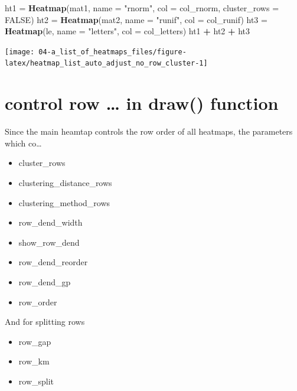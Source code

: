 \documentclass[]{book}
\newenvironment{Shaded}{\begin{snugshade}}{\end{snugshade}}
\newcommand{\KeywordTok}[1]{\textcolor[rgb]{0.13,0.29,0.53}{\textbf{#1}}}
\newcommand{\DataTypeTok}[1]{\textcolor[rgb]{0.13,0.29,0.53}{#1}}
\newcommand{\StringTok}[1]{\textcolor[rgb]{0.31,0.60,0.02}{#1}}
\newcommand{\OtherTok}[1]{\textcolor[rgb]{0.56,0.35,0.01}{#1}}
\newcommand{\OperatorTok}[1]{\textcolor[rgb]{0.81,0.36,0.00}{\textbf{#1}}}
\newcommand{\NormalTok}[1]{#1}
\providecommand{\tightlist}{%
  \setlength{\itemsep}{0pt}\setlength{\parskip}{0pt}}
\theoremstyle{definition}
\theoremstyle{definition}
\theoremstyle{definition}
\theoremstyle{remark}
\begin{document}
\begin{Shaded}
\begin{Highlighting}[]
\NormalTok{ht1 =}\StringTok{ }\KeywordTok{Heatmap}\NormalTok{(mat1, }\DataTypeTok{name =} \StringTok{"rnorm"}\NormalTok{, }\DataTypeTok{col =}\NormalTok{ col_rnorm, }\DataTypeTok{cluster_rows =} \OtherTok{FALSE}\NormalTok{)}
\NormalTok{ht2 =}\StringTok{ }\KeywordTok{Heatmap}\NormalTok{(mat2, }\DataTypeTok{name =} \StringTok{"runif"}\NormalTok{, }\DataTypeTok{col =}\NormalTok{ col_runif)}
\NormalTok{ht3 =}\StringTok{ }\KeywordTok{Heatmap}\NormalTok{(le, }\DataTypeTok{name =} \StringTok{"letters"}\NormalTok{, }\DataTypeTok{col =}\NormalTok{ col_letters)}
\NormalTok{ht1 }\OperatorTok{+}\StringTok{ }\NormalTok{ht2 }\OperatorTok{+}\StringTok{ }\NormalTok{ht3}
\end{Highlighting}
\end{Shaded}

\begin{center}\texttt{[image: 04-a\_list\_of\_heatmaps\_files/figure-latex/heatmap\_list\_auto\_adjust\_no\_row\_cluster-1]} \end{center}

\section{control row \ldots{} in draw()
function}\label{control-row-in-draw-function}

Since the main heamtap controls the row order of all heatmaps, the
parameters which co\ldots{}

\begin{itemize}
\tightlist
\item
  cluster\_rows
\item
  clustering\_distance\_rows
\item
  clustering\_method\_rows
\item
  row\_dend\_width
\item
  show\_row\_dend
\item
  row\_dend\_reorder
\item
  row\_dend\_gp
\item
  row\_order
\end{itemize}

And for splitting rows

\begin{itemize}
\tightlist
\item
  row\_gap
\item
  row\_km
\item
  row\_split
\end{itemize}
\end{document}
